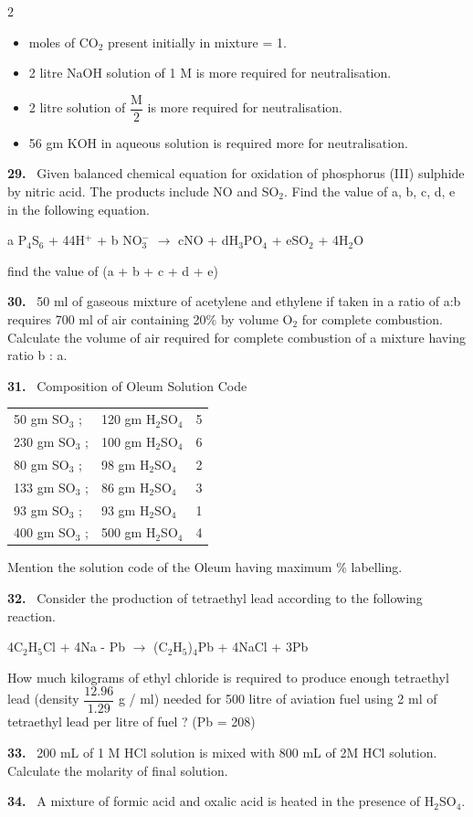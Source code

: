 \documentclass[10pt]{extarticle}
\newcommand{\qn}[1]{\par\smallskip\noindent\textbf{#1.}~}
\newenvironment{qoptions}{\begin{itemize}[leftmargin=1.8em,itemsep=1pt,topsep=2pt,label={}]}{\end{itemize}}
\newcommand{\opt}[2]{\item[(#1)] #2}
\begin{document}
\begin{multicols}{2}
\begin{qoptions}
\opt{A}{moles of CO$_2$ present initially in mixture = 1.}
\opt{B}{2 litre NaOH solution of 1 M is more required for neutralisation.}
\opt{C}{2 litre solution of $\dfrac{\mathrm M}2$ is more required for neutralisation.}
\opt{D}{56 gm KOH in aqueous solution is required more for neutralisation.}
\end{qoptions}
\qn{29} Given balanced chemical equation for oxidation of phosphorus (III) sulphide by nitric acid. The products include NO and SO$_2$. Find the value of a, b, c, d, e in the following equation.\par
a P$_4$S$_6$ + 44H$^+$ + b NO$_3^-$ $\to$ cNO + dH$_3$PO$_4$ + eSO$_2$ + 4H$_2$O\par
find the value of (a + b + c + d + e)
\qn{30} 50 ml of gaseous mixture of acetylene and ethylene if taken in a ratio of a:b requires 700 ml of air containing 20\% by volume O$_2$ for complete combustion. Calculate the volume of air required for complete combustion of a mixture having ratio b : a.
\qn{31} Composition of Oleum \hfill Solution Code\par
{\small\setlength{\tabcolsep}{3pt}\noindent\begin{tabular}{ll@{\quad}c}
50 gm SO$_3$ ; & 120 gm H$_2$SO$_4$ & 5 \\
230 gm SO$_3$ ; & 100 gm H$_2$SO$_4$ & 6 \\
80 gm SO$_3$ ; & 98 gm H$_2$SO$_4$ & 2 \\
133 gm SO$_3$ ; & 86 gm H$_2$SO$_4$ & 3 \\
93 gm SO$_3$ ; & 93 gm H$_2$SO$_4$ & 1 \\
400 gm SO$_3$ ; & 500 gm H$_2$SO$_4$ & 4 \\
\end{tabular}}\par
Mention the solution code of the Oleum having maximum \% labelling.
\qn{32} Consider the production of tetraethyl lead according to the following reaction.\par
4C$_2$H$_5$Cl + 4Na - Pb $\longrightarrow$ (C$_2$H$_5$)$_4$Pb + 4NaCl + 3Pb\par
How much kilograms of ethyl chloride is required to produce enough tetraethyl lead (density $\dfrac{12.96}{1.29}$ g / ml) needed for 500 litre of aviation fuel using 2 ml of tetraethyl lead per litre of fuel ? (Pb = 208)
\qn{33} 200 mL of 1 M HCl solution is mixed with 800 mL of 2M HCl solution. Calculate the molarity of final solution.
\qn{34} A mixture of formic acid and oxalic acid is heated in the presence of H$_2$SO$_4$.\par

\end{multicols}
\end{document}
